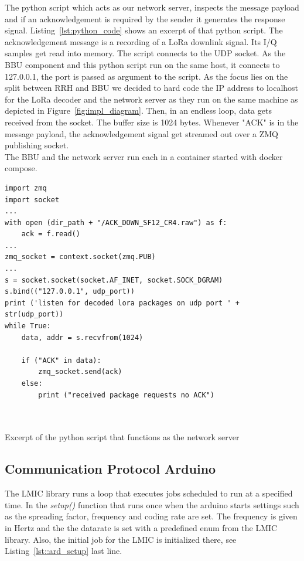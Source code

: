 The python script which acts as our network server, inspects the message payload and if an 
acknowledgement is required by the sender it generates the response signal. 
Listing~\ref{lst:python_code} shows an excerpt of that python script.
The acknowledgement message is a recording of a LoRa downlink signal. Its I/Q samples get read into memory.
The script connects to the UDP socket. As the BBU component and this python script run on the same host, it connects
to 127.0.0.1, the port is passed as argument to the script. As the focus lies on the split between RRH and BBU we decided
to hard code the IP address to localhost for the LoRa decoder and the network server as they run on the same machine as depicted 
in Figure~\ref{fig:impl_diagram}. 
Then, in an endless loop, data gets received from the socket. The buffer size is 1024 bytes.
Whenever "ACK" is in the message payload, the acknowledgement signal get streamed out over a ZMQ publishing socket.
\\
The BBU and the network server run each in a container started with docker compose.


\begin{listing}[h]
\begin{verbatim}
import zmq
import socket
...
with open (dir_path + "/ACK_DOWN_SF12_CR4.raw") as f:
    ack = f.read()
...
zmq_socket = context.socket(zmq.PUB)
...
s = socket.socket(socket.AF_INET, socket.SOCK_DGRAM)
s.bind(("127.0.0.1", udp_port))
print ('listen for decoded lora packages on udp port ' + str(udp_port))
while True:
    data, addr = s.recvfrom(1024)

    if ("ACK" in data):
        zmq_socket.send(ack) 
    else:
        print ("received package requests no ACK")
     
    
    \end{verbatim}
    \caption{Excerpt of the python script that functions as the network server}
    \label{lst:python_code}
\end{listing}

\subsection{Communication Protocol Arduino}
\label{sec:comm_prot}

The LMIC library runs a loop that executes jobs scheduled to run at a specified time. 
In the \emph{setup()} function that runs once when the arduino starts settings such as 
the spreading factor, frequency and coding rate are set. The frequency is given in Hertz and the the datarate 
is set with a predefined enum from the LMIC library. Also, the initial job for the LMIC is initialized there, see 
Listing~\ref{lst::ard_setup} last line.

